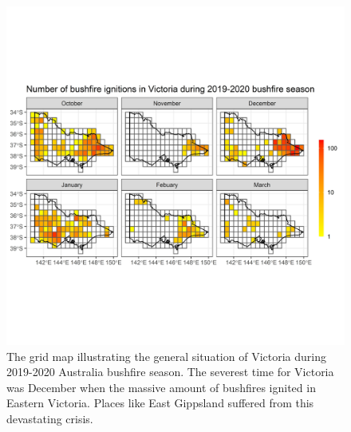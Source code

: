 \documentclass[11pt,a4paper,]{article}
\begin{document}
\begin{figure}
\centering
\includegraphics[width=5.20833in,height=\textheight]{figures/number_of_ignitions.jpg}
\caption{The grid map illustrating the general situation of Victoria during 2019-2020 Australia bushfire season. The severest time for Victoria was December when the massive amount of bushfires ignited in Eastern Victoria. Places like East Gippsland suffered from this devastating crisis. \label{fig:overview}}
\end{figure}

\clearpage

\printbibliography
\end{document}
